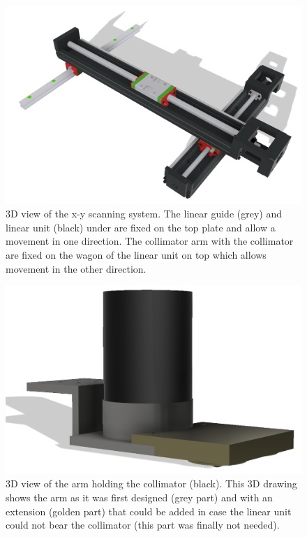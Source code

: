 \documentclass[11pt,a4paper]{article}
\begin{document}
\begin{figure}[!h]
\centering
\includegraphics[scale=0.4]{position.png}
\caption{3D view of the x-y scanning system. The linear guide (grey) and linear unit (black) under are fixed on the top plate and allow a movement in one direction. The collimator arm with the collimator are fixed on the wagon of the linear unit on top which allows movement in the other direction.}
\label{scan}
\end{figure}

\begin{figure}[!h]
\centering
\includegraphics[scale=0.4]{Arm.png}
\caption{3D view of the arm holding the collimator (black). This 3D drawing shows the arm as it was first designed (grey part) and with an extension (golden part) that could be added in case the linear unit could not bear the collimator (this part was finally not needed).}
\label{arm}
\end{figure}
\end{document}

